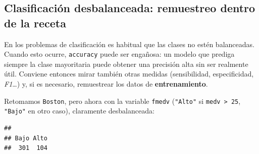 \documentclass[
]{book}
\newenvironment{Shaded}{\begin{snugshade}}{\end{snugshade}}
\newcommand{\AttributeTok}[1]{\textcolor[rgb]{0.13,0.29,0.53}{#1}}
\newcommand{\CommentTok}[1]{\textcolor[rgb]{0.56,0.35,0.01}{\textit{#1}}}
\newcommand{\DecValTok}[1]{\textcolor[rgb]{0.00,0.00,0.81}{#1}}
\newcommand{\FloatTok}[1]{\textcolor[rgb]{0.00,0.00,0.81}{#1}}
\newcommand{\FunctionTok}[1]{\textcolor[rgb]{0.13,0.29,0.53}{\textbf{#1}}}
\newcommand{\NormalTok}[1]{#1}
\newcommand{\OtherTok}[1]{\textcolor[rgb]{0.56,0.35,0.01}{#1}}
\newcommand{\SpecialCharTok}[1]{\textcolor[rgb]{0.81,0.36,0.00}{\textbf{#1}}}
\newcommand{\StringTok}[1]{\textcolor[rgb]{0.31,0.60,0.02}{#1}}
\theoremstyle{break}
\theoremstyle{nonumberplain}
\renewcommand{\CommentTok}[1]{\textcolor[rgb]{0.41,0.41,0.41}{\texttt{#1}}}
\begin{document}
\subsection{Clasificación desbalanceada: remuestreo dentro de la receta}\label{desbalanceo}

En los problemas de clasificación es habitual que las clases no estén balanceadas. Cuando esto ocurre, \texttt{accuracy} puede ser engañosa: un modelo que prediga siempre la clase mayoritaria puede obtener una precisión alta sin ser realmente útil. Conviene entonces mirar también otras medidas (sensibilidad, especificidad, \emph{F1}\ldots) y, si es necesario, remuestrear los datos de \textbf{entrenamiento}.

Retomamos \texttt{Boston}, pero ahora con la variable \texttt{fmedv} (\texttt{"Alto"} si \texttt{medv\ \textgreater{}\ 25}, \texttt{"Bajo"} en otro caso), claramente desbalanceada:

\begin{Shaded}
\end{Shaded}

\begin{verbatim}
## 
## Bajo Alto 
##  301  104
\end{verbatim}
\end{document}
